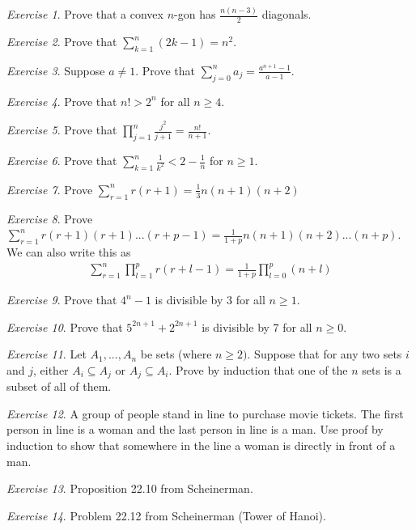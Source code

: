 \documentclass[11pt]{article}
\theoremstyle{plain}
\theoremstyle{definition}
\theoremstyle{remark}
\newtheorem{exc}{Exercise}[section]
\begin{document}
\begin{exc}
    Prove that a convex $n$-gon has $\frac{n(n-3)}{2}$ diagonals.
\end{exc}
\begin{exc}
    Prove that $\sum_{k=1}^n (2k-1) = n^2$.
\end{exc}
\begin{exc}
    Suppose $a \neq 1$. Prove that $\sum_{j=0}^n a_j = \frac{a^{n+1} - 1}{a-1}$.
\end{exc}
\begin{exc}
    Prove that $n! > 2^n$ for all $n \geq 4$.
\end{exc}
\begin{exc}
    Prove that $\prod_{j=1}^n \frac{j^2}{j+1} = \frac{n!}{n+1}$.
\end{exc}
\begin{exc}
    Prove that $\sum_{k=1}^n \frac{1}{k^2} < 2 - \frac{1}{n}$ for $n \geq 1$.
\end{exc}
\begin{exc}
    Prove $\sum_{r=1}^n r(r+1) = \frac{1}{3} n(n+1)(n+2)$
\end{exc}
\begin{exc}
    Prove $\sum_{r=1}^n r(r+1)(r+1)...(r+p-1) = \frac{1}{1+p} n(n+1)(n+2)...(n+p)$. We can also write this as
    \begin{align*}
        \sum_{r=1}^n \prod_{l=1}^p r(r+l-1) = \frac{1}{1+p} \prod_{l=0}^p (n+l)
    \end{align*}
\end{exc}
\begin{exc}
    Prove that $4^n - 1$ is divisible by 3 for all $n \geq 1$.
\end{exc}
\begin{exc}
    Prove that $5^{2n+1} + 2^{2n+1}$ is divisible by 7 for all $n \geq 0$.
\end{exc}
\begin{exc}
    Let $A_1, ..., A_n$ be sets (where $n \geq 2)$. Suppose that for any two sets $i$ and $j$, either $A_i \subseteq A_j$ or $A_j \subseteq A_i$. Prove by induction that one of the $n$ sets is a subset of all of them.
\end{exc}
\begin{exc}
    A group of people stand in line to purchase movie tickets. The first person in line is a woman and the last person in line is a man. Use proof by induction to show that somewhere in the line a woman is directly in front of a man.
\end{exc}
\begin{exc}
    Proposition 22.10 from Scheinerman.
\end{exc}
\begin{exc}
    Problem 22.12 from Scheinerman (Tower of Hanoi).
\end{exc}
\end{document}
